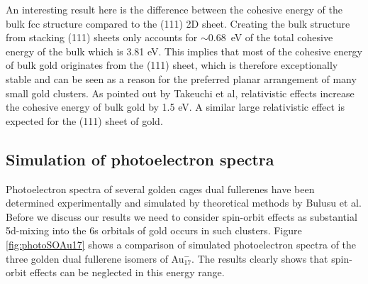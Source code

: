 An interesting result here is the difference between the cohesive energy of the
bulk fcc structure compared to the (111) 2D sheet. Creating the bulk structure
from stacking (111) sheets only accounts for $\sim$0.68~eV of the total
cohesive energy of the bulk which is 3.81
eV.\autocite{takeuchi_first-principles_1989} This implies that most of the
cohesive energy of bulk gold originates from the (111) sheet, which is
therefore exceptionally stable and can be seen as a reason for the preferred
planar arrangement of many small gold clusters.  As pointed out by Takeuchi et
al, relativistic effects increase the cohesive energy of bulk gold by 1.5
eV.\autocite{takeuchi_first-principles_1989} A similar large relativistic
effect is expected for the (111) sheet of gold.

\subsection{Simulation of photoelectron spectra}

Photoelectron spectra of several golden cages dual fullerenes have been
determined experimentally and simulated by theoretical methods by Bulusu et
al.\autocite{Bulusu_Evidencehollowgolden_2006} Before we discuss our results we
need to consider spin-orbit effects as substantial 5d-mixing into the 6s
orbitals of gold occurs in such clusters. Figure \ref{fig:photoSOAu17} shows a
comparison of simulated photoelectron spectra of the three golden dual
fullerene isomers of Au$_{17}^-$. The results clearly shows that spin-orbit
effects can be neglected in this energy range.

